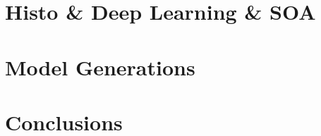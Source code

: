 \documentclass[12pt,a4paper]{report}
\begin{document}




\tableofcontents{}



\chapter{Histo \& Deep Learning \& SOA}
    
    
    

\chapter{Model Generations}
    

\chapter{Conclusions}
    


\end{document}
